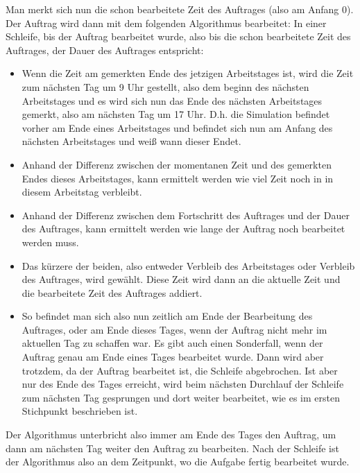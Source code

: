 \documentclass[a4paper,10pt,ngerman]{scrartcl}
\begin{document}
Man merkt sich nun die schon bearbeitete Zeit des Auftrages (also am Anfang 0).
Der Auftrag wird dann mit dem folgenden Algorithmus bearbeitet:
In einer Schleife, bis der Auftrag bearbeitet wurde, also bis die schon bearbeitete Zeit des Auftrages,
der Dauer des Auftrages entspricht:
\begin{itemize}
\item Wenn die Zeit am gemerkten Ende des jetzigen Arbeitstages ist, wird die Zeit zum nächsten Tag um 9 Uhr gestellt,
			                  also dem beginn des nächsten Arbeitstages und
			                  es wird sich nun das Ende des nächsten Arbeitstages gemerkt, also am nächsten Tag um 17 Uhr.
			                  D.h. die Simulation befindet vorher am Ende eines Arbeitstages
			                  und befindet sich nun am Anfang des nächsten Arbeitstages und weiß wann dieser Endet.
			            \item Anhand der Differenz zwischen der momentanen Zeit
			            	  und des gemerkten Endes dieses Arbeitstages,
			                  kann ermittelt werden wie viel Zeit noch in in diesem Arbeitstag verbleibt.
			            \item Anhand der Differenz zwischen dem Fortschritt des Auftrages
			                  und der Dauer des Auftrages,
			                  kann ermittelt werden wie lange der Auftrag noch bearbeitet werden muss.
			            \item Das kürzere der beiden,
			            	  also entweder Verbleib des Arbeitstages oder Verbleib des Auftrages,
			                  wird gewählt.
			                  Diese Zeit wird dann an die aktuelle Zeit
			                  und die bearbeitete Zeit des Auftrages addiert.
			            \item So befindet man sich also nun zeitlich am Ende der Bearbeitung des Auftrages,
			            	  oder am Ende dieses Tages,
			            	  wenn der Auftrag nicht mehr im aktuellen Tag zu schaffen war.
			            	  Es gibt auch einen Sonderfall,
			            	  wenn der Auftrag genau am Ende eines Tages bearbeitet wurde.
			            	  Dann wird aber trotzdem, da der Auftrag bearbeitet ist,
			            	  die Schleife abgebrochen.
			            	  Ist aber nur des Ende des Tages erreicht,
			            	  wird beim nächsten Durchlauf der Schleife
			            	  zum nächsten Tag gesprungen und dort weiter bearbeitet,
			            	  wie es im ersten Stichpunkt beschrieben ist.
\end{itemize}
Der Algorithmus unterbricht also immer am Ende des Tages den Auftrag,
um dann am nächsten Tag weiter den Auftrag zu bearbeiten.
Nach der Schleife ist der Algorithmus also an dem Zeitpunkt,
wo die Aufgabe fertig bearbeitet wurde.
\end{document}
